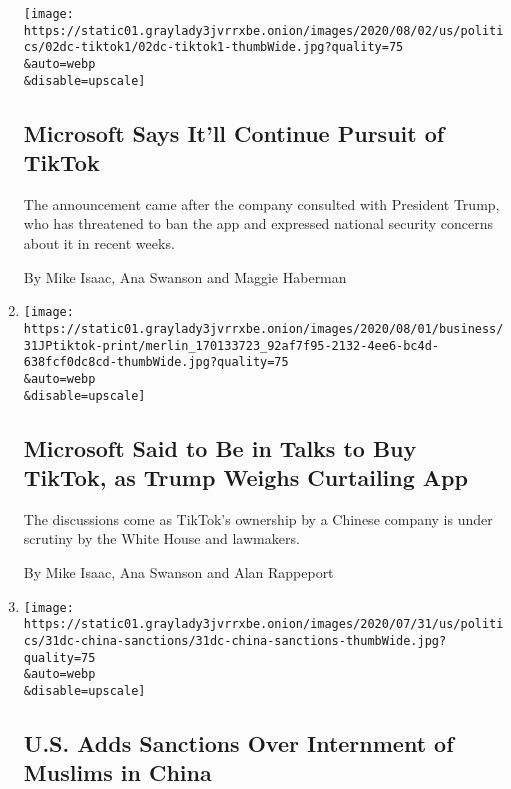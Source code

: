 \begin{enumerate}
  \texttt{[image: https://static01.graylady3jvrrxbe.onion/images/2020/08/02/us/politics/02dc-tiktok1/02dc-tiktok1-thumbWide.jpg?quality=75\\\&auto=webp\\\&disable=upscale]}

  \hypertarget{microsoft-says-itll-continue-pursuit-of-tiktok}{%
  \subsection{Microsoft Says It'll Continue Pursuit of
  TikTok}\label{microsoft-says-itll-continue-pursuit-of-tiktok}}

  The announcement came after the company consulted with President
  Trump, who has threatened to ban the app and expressed national
  security concerns about it in recent weeks.

  By Mike Isaac, Ana Swanson and Maggie Haberman
\item
  \href{/2020/07/31/technology/tiktok-microsoft.html}{}

  \texttt{[image: https://static01.graylady3jvrrxbe.onion/images/2020/08/01/business/31JPtiktok-print/merlin\_170133723\_92af7f95-2132-4ee6-bc4d-638fcf0dc8cd-thumbWide.jpg?quality=75\\\&auto=webp\\\&disable=upscale]}

  \hypertarget{microsoft-said-to-be-in-talks-to-buy-tiktok-as-trump-weighs-curtailing-app}{%
  \subsection{Microsoft Said to Be in Talks to Buy TikTok, as Trump
  Weighs Curtailing
  App}\label{microsoft-said-to-be-in-talks-to-buy-tiktok-as-trump-weighs-curtailing-app}}

  The discussions come as TikTok's ownership by a Chinese company is
  under scrutiny by the White House and lawmakers.

  By Mike Isaac, Ana Swanson and Alan Rappeport
\item
  \href{/2020/07/31/us/politics/sanctions-china-xinjiang-uighurs.html}{}

  \texttt{[image: https://static01.graylady3jvrrxbe.onion/images/2020/07/31/us/politics/31dc-china-sanctions/31dc-china-sanctions-thumbWide.jpg?quality=75\\\&auto=webp\\\&disable=upscale]}

  \hypertarget{us-adds-sanctions-over-internment-of-muslims-in-china}{%
  \subsection{U.S. Adds Sanctions Over Internment of Muslims in
  China}\label{us-adds-sanctions-over-internment-of-muslims-in-china}}


\end{enumerate}
